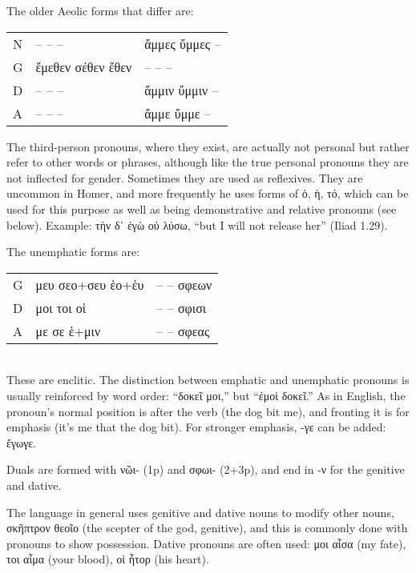 \begin{small}
\pagebreak

The older Aeolic forms that differ are:\\
%
\begin{tabular}{lll}
N & -- -- --  & ἄμμες ὔμμες -- \\
G & ἔμεθεν σέθεν ἕθεν & -- -- -- \\
D & -- -- --  & ἄμμιν ὔμμιν -- \\
A & -- -- --  & ἄμμε ὔμμε -- 
\end{tabular}

The third-person pronouns, where they exist, are actually not personal but
rather refer to other words or phrases, although like the true personal
pronouns they are not inflected for gender. Sometimes they are used as reflexives.
They are uncommon in Homer, and more
frequently he uses forms of ὁ, ἡ, τό, which can be used for this purpose as well
as being demonstrative and relative pronouns (see below). Example: τὴν δ᾽ ἐγὼ οὐ λύσω,
``but I will not release her'' (Iliad 1.29).

The unemphatic forms are:\\
%
\begin{tabular}{lll}
G & μευ σεο+σευ ἑο+ἑυ & -- -- σφεων \\
D & μοι τοι οἱ        & -- -- σφισι \\
A & με σε ἑ+μιν       & -- -- σφεας
\end{tabular}\\
%
These are enclitic. The distinction between emphatic and unemphatic pronouns
is usually reinforced by word order:
``δοκεῖ μοι,'' but ``ἐμοὶ δοκεῖ.'' As in English, the pronoun's normal position is after
the verb (the dog bit me), and fronting it is for emphasis (it's me
that the dog bit). For stronger emphasis, -γε can be added: ἔγωγε.

Duals are formed with νῶι- (1p) and σφωι- (2+3p), and end in -ν for the genitive and dative.


The language in general uses genitive and dative
nouns to modify other nouns, σκῆπτρον θεοῖο (the scepter of the god, genitive), and this is commonly done with
pronouns to show possession. Dative pronouns are often used: μοι αἶσα (my fate), τοι αἷμα (your blood), οἱ ἦτορ (his heart).


\end{small}
